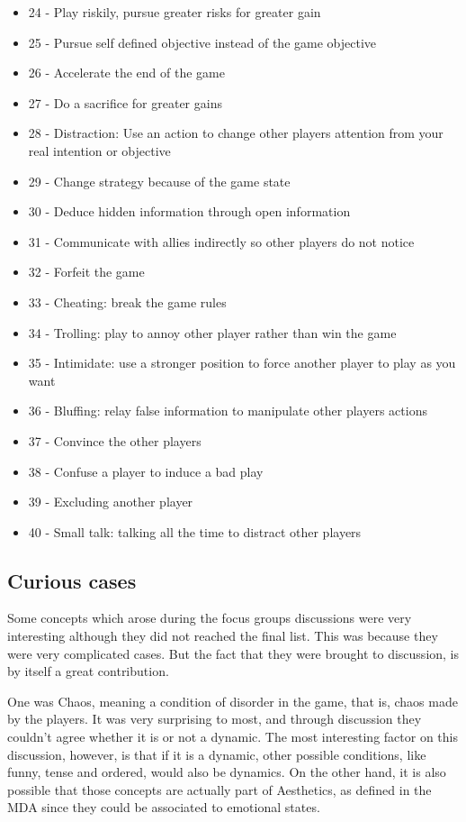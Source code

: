 \begin{multicols}{2}
\begin{itemize}
    \item 24 - Play riskily, pursue greater risks for greater gain
    \item 25 - Pursue self defined objective instead of the game objective
    \item 26 - Accelerate the end of the game
    \item 27 - Do a sacrifice for greater gains
    \item 28 - Distraction: Use an action to change other players attention from your real intention or objective
    \item 29 - Change strategy because of the game state
    \item 30 - Deduce hidden information through open information
    \item 31 - Communicate with allies indirectly so other players do not notice
    \item 32 - Forfeit the game
    \item 33 - Cheating: break the game rules
    \item 34 - Trolling: play to annoy other player rather than win the game
    \item 35 - Intimidate: use a stronger position to force another player to play as you want
    \item 36 - Bluffing: relay false information to manipulate other players actions
    \item 37 - Convince the other players
    \item 38 - Confuse a player to induce a bad play
    \item 39 - Excluding another player
    \item 40 - Small talk: talking all the time to distract other players
 \end{itemize}
\end{multicols}

\subsection{Curious cases}

Some concepts which arose during the focus groups discussions were very interesting although they did not reached the final list. This was because they were very complicated cases. But the fact that they were brought to discussion, is by itself a great contribution. 

One was Chaos, meaning a condition of disorder in the
game, that is, chaos made by the players. It was very
surprising to most, and through discussion they couldn’t
agree whether it is or not a dynamic. The most interesting
factor on this discussion, however, is that if it is a dynamic,
other possible conditions, like funny, tense and ordered,
would also be dynamics. On the other hand, it is also
possible that those concepts are actually part of Aesthetics,
as defined in the MDA\cite{Hunicke2004} since they could be associated to
emotional states.

